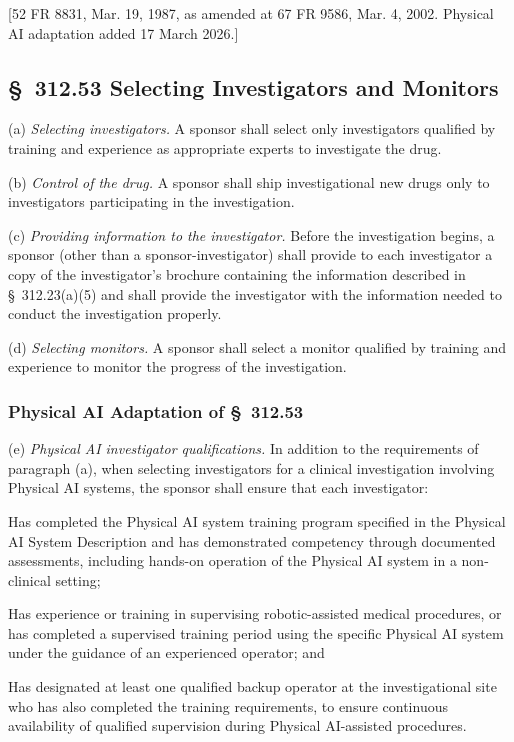 [52 FR 8831, Mar. 19, 1987, as amended at 67 FR 9586, Mar. 4, 2002. Physical AI adaptation added 17 March 2026.]

\subsection{\S~312.53 Selecting Investigators and Monitors}

(a) \textit{Selecting investigators.} A sponsor shall select only investigators qualified by training and experience as appropriate experts to investigate the drug.

(b) \textit{Control of the drug.} A sponsor shall ship investigational new drugs only to investigators participating in the investigation.

(c) \textit{Providing information to the investigator.} Before the investigation begins, a sponsor (other than a sponsor-investigator) shall provide to each investigator a copy of the investigator's brochure containing the information described in \S~312.23(a)(5) and shall provide the investigator with the information needed to conduct the investigation properly.

(d) \textit{Selecting monitors.} A sponsor shall select a monitor qualified by training and experience to monitor the progress of the investigation.

\subsubsection{Physical AI Adaptation of \S~312.53}

(e) \textit{Physical AI investigator qualifications.} In addition to the requirements of paragraph (a), when selecting investigators for a clinical investigation involving Physical AI systems, the sponsor shall ensure that each investigator:

\begin{description}[leftmargin=0.8cm,style=sameline]
\item[(i)] Has completed the Physical AI system training program specified in the Physical AI System Description and has demonstrated competency through documented assessments, including hands-on operation of the Physical AI system in a non-clinical setting;
\item[(ii)] Has experience or training in supervising robotic-assisted medical procedures, or has completed a supervised training period using the specific Physical AI system under the guidance of an experienced operator; and
\item[(iii)] Has designated at least one qualified backup operator at the investigational site who has also completed the training requirements, to ensure continuous availability of qualified supervision during Physical AI-assisted procedures.
\end{description}

